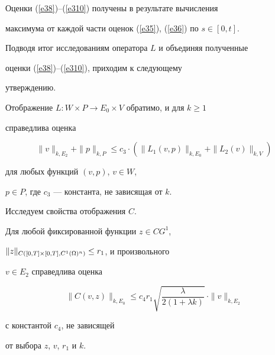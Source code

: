 Оценки (\ref{e38})--(\ref{e310}) получены в результате вычисления


максимума от каждой части оценок (\ref{e35}), (\ref{e36}) по $s\in [0,t]$.





Подводя итог исследованиям оператора $L$ и объединяя полученные


оценки (\ref{e38})--(\ref{e310}), приходим к следующему


утверждению.





\begin{thms}\label{t31}


Отображение $L:W\times P\to E_0\times V$ обратимо, и для $k\ge 1$


справедлива оценка


\begin{equation}\label{e311}


\|v\|_{k,E_2}+\|p\|_{k,P} \le c_3 \cdot (\|L_1(v,p)\|_{k,E_0}+


\|L_2(v)\|_{k,V})


\end{equation}


для любых функций $(v,p)$, $v \in W$,


$p \in P$, где $c_3$ --- константа, не зависящая от $k$.


\end{thms}





Исследуем свойства отображения $C$.





\begin{lems}\label{l34}


Для любой фиксированной функции $z \in CG^1$,


$\|z\|_{C([0,T]\times [0,T], C^1(\Omega)^n)}\le r_1$, и произвольного


$v \in E_2$ справедлива оценка


\begin{equation}\label{e312}


\| C(v,z)\|_{k,E_0} \le c_4 r_1 \sqrt {\frac{\lambda}{2(1+\lambda


k)}}\, \cdot \|v\|_{k,E_2}


\end{equation}


с константой $c_4$, не зависящей


от выбора $z$, $v$, $r_1$ и $k$.


\end{lems}





